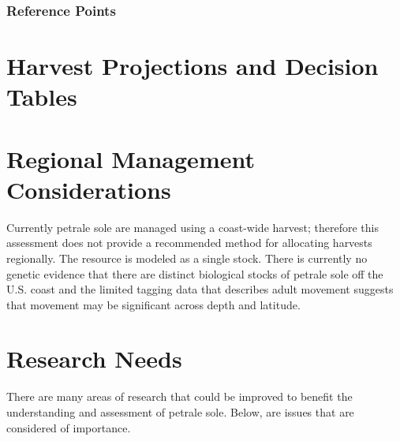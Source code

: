 \documentclass[12pt,]{article}
\begin{document}
\subsubsection{Reference Points}\label{reference-points-1}

\section{Harvest Projections and Decision
Tables}\label{harvest-projections-and-decision-tables}

\section{Regional Management
Considerations}\label{regional-management-considerations}

Currently petrale sole are managed using a coast-wide harvest; therefore
this assessment does not provide a recommended method for allocating
harvests regionally. The resource is modeled as a single stock. There is
currently no genetic evidence that there are distinct biological stocks
of petrale sole off the U.S. coast and the limited tagging data that
describes adult movement suggests that movement may be significant
across depth and latitude.

\section{Research Needs}\label{research-needs}

There are many areas of research that could be improved to benefit the
understanding and assessment of petrale sole. Below, are issues that are
considered of importance.
\end{document}

